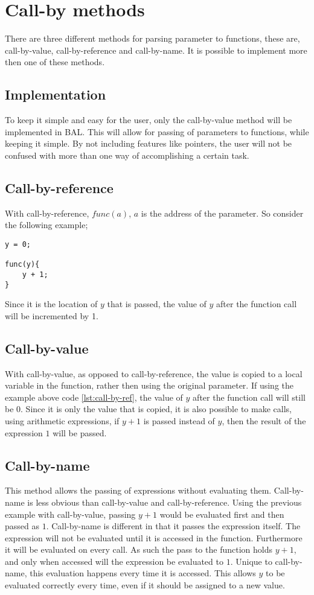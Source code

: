 \section{Call-by methods}
There are three different methods for parsing parameter to functions, these are, call-by-value, call-by-reference and call-by-name. It is possible to implement more then one of these methods.

\subsection*{Implementation}To keep it simple and easy for the user, only the call-by-value method will be implemented in BAL. This will allow for passing of parameters to functions, while keeping it simple. By not including features like pointers, the user will not be confused with more than one way of accomplishing a certain task.

\subsection*{Call-by-reference}
With call-by-reference, $func(a)$, $a$ is the address of the parameter. So consider the following example;
\begin{lstlisting}[caption=call-by-reference example, label=lst:call-by-ref]
y = 0;

func(y){
	y + 1;
}
\end{lstlisting}
Since it is the location of $y$ that is passed, the value of $y$ after the function call will be incremented by 1.
\subsection*{Call-by-value}
With call-by-value, as opposed to call-by-reference, the value is copied to a local variable in the function, rather then using the original parameter. If using the example above code \ref{lst:call-by-ref}, the value of $y$ after the function call will still be $0$. Since it is only the value that  is copied, it is also possible to make calls, using arithmetic expressions, if $y+1$ is passed instead of $y$, then the result of the expression $1$ will be passed.
\subsection*{Call-by-name}
This method allows the passing of expressions without evaluating them. Call-by-name is less obvious than call-by-value and call-by-reference. Using the previous example with call-by-value, passing $y+1$ would be evaluated first and then passed as $1$. Call-by-name is different in that it passes the expression itself. The expression will not be evaluated until it is accessed in the function. Furthermore it will be evaluated on every call. As such the pass to the function holds $y+1$, and only when accessed will the expression be evaluated to $1$. Unique to call-by-name, this evaluation happens every time it is accessed. This allows $y$ to be evaluated correctly every time, even if it should be assigned to a new value.
